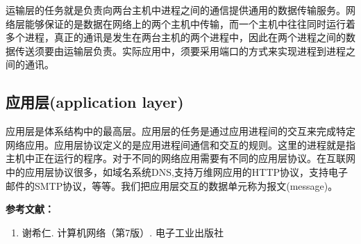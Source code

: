 运输层的任务就是负责向两台主机中进程之间的通信提供通用的数据传输服务。网络层能够保证的是数据在网络上的两个主机中传输，而一个主机中往往同时运行着多个进程，真正的通讯是发生在两台主机的两个进程中，因此在两个进程之间的数据传送须要由运输层负责。实际应用中，须要采用端口的方式来实现进程到进程之间的通讯。


\subsection{应用层(application layer)}

应用层是体系结构中的最高层。应用层的任务是通过应用进程间的交互来完成特定网络应用。应用层协议定义的是应用进程间通信和交互的规则。这里的进程就是指主机中正在运行的程序。对于不同的网络应用需要有不同的应用层协议。在互联网中的应用层协议很多，如域名系统DNS,支持万维网应用的HTTP协议，支持电子邮件的SMTP协议，等等。我们把应用层交互的数据单元称为报文(message)。




\textbf{参考文献：}
\begin{enumerate}
\item 谢希仁. 计算机网络（第7版）. 电子工业出版社
\end{enumerate}